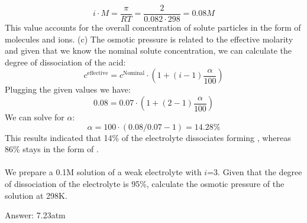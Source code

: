 \documentclass[main.tex]{subfiles}
\begin{document}
\begin{description}
\begin{example}
\[i\cdot M=\frac{\pi}{RT}=\frac{2}{0.082\cdot 298}=0.08M\]
This value accounts for the overall concentration of solute particles in the form of molecules and ions.
(c)  The osmotic pressure is related to the effective molarity and given that we know the nominal solute concentration, we can calculate the degree of dissociation of the acid:
\[c^{\text{effective}}=c^{\text{Nominal}}\cdot (1+ (i-1)\frac{\alpha}{100})\]
Plugging the given values we have:
\[0.08=0.07\cdot (1+ (2-1)\frac{\alpha}{100}) \]
We can solve for $\alpha$:
\[ \alpha=100\cdot (0.08/0.07-1)=14.28\% \]
This results indicated that 14\% of the electrolyte dissociates  forming , whereas 86\% stays in the form of .\\
\faDiamond\ \\
We prepare a 0.1M solution of a weak electrolyte with $i$=3. Given that the degree of dissociation of the electrolyte is 95\%, calculate the osmotic pressure of the solution at 298K.
\\
\begin{flushright} Answer: 7.23atm\end{flushright}
\end{example}%
  



\end{description}
\end{document}
